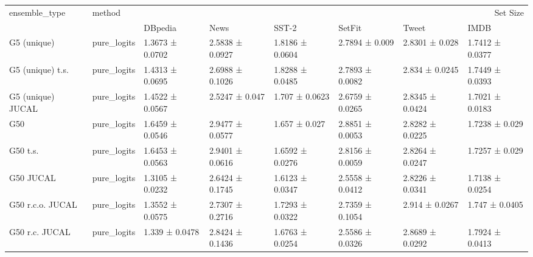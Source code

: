 \begin{tabular}{llllllll}
\toprule
ensemble_type & method & \multicolumn{6}{r}{Set Size} \\
 &  & DBpedia & News & SST-2 & SetFit & Tweet & IMDB \\
\midrule
G5 (unique) & pure_logits & 1.3673 ± 0.0702 & 2.5838 ± 0.0927 & 1.8186 ± 0.0604 & 2.7894 ± 0.009 & 2.8301 ± 0.028 & 1.7412 ± 0.0377 \\
G5 (unique) t.s. & pure_logits & 1.4313 ± 0.0695 & 2.6988 ± 0.1026 & 1.8288 ± 0.0485 & 2.7893 ± 0.0082 & 2.834 ± 0.0245 & 1.7449 ± 0.0393 \\
G5 (unique) JUCAL & pure_logits & 1.4522 ± 0.0567 & 2.5247 ± 0.047 & 1.707 ± 0.0623 & 2.6759 ± 0.0265 & 2.8345 ± 0.0424 & 1.7021 ± 0.0183 \\
G50 & pure_logits & 1.6459 ± 0.0546 & 2.9477 ± 0.0577 & 1.657 ± 0.027 & 2.8851 ± 0.0053 & 2.8282 ± 0.0225 & 1.7238 ± 0.029 \\
G50 t.s. & pure_logits & 1.6453 ± 0.0563 & 2.9401 ± 0.0616 & 1.6592 ± 0.0276 & 2.8156 ± 0.0059 & 2.8264 ± 0.0247 & 1.7257 ± 0.029 \\
G50 JUCAL & pure_logits & 1.3105 ± 0.0232 & 2.6424 ± 0.1745 & 1.6123 ± 0.0347 & 2.5558 ± 0.0412 & 2.8226 ± 0.0341 & 1.7138 ± 0.0254 \\
G50 r.c.o. JUCAL & pure_logits & 1.3552 ± 0.0575 & 2.7307 ± 0.2716 & 1.7293 ± 0.0322 & 2.7359 ± 0.1054 & 2.914 ± 0.0267 & 1.747 ± 0.0405 \\
G50 r.c. JUCAL & pure_logits & 1.339 ± 0.0478 & 2.8424 ± 0.1436 & 1.6763 ± 0.0254 & 2.5586 ± 0.0326 & 2.8689 ± 0.0292 & 1.7924 ± 0.0413 \\
\bottomrule
\end{tabular}
